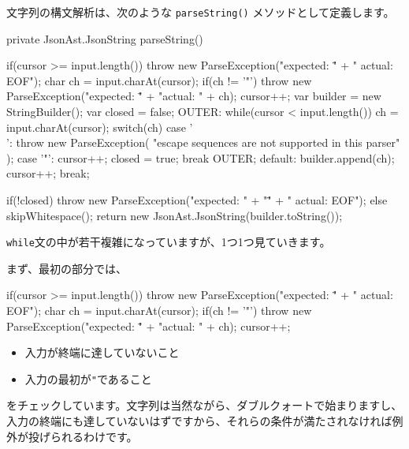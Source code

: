 文字列の構文解析は、次のような \texttt{parseString()}
メソッドとして定義します。

\begin{codescreen}{}
    private JsonAst.JsonString parseString() {
        if(cursor >= input.length()) {
            throw new ParseException("expected: \"" + " actual: EOF");
        }
        char ch = input.charAt(cursor);
        if(ch != '"') {
            throw new ParseException("expected: \"" + "actual: " + ch);
        }
        cursor++;
        var builder = new StringBuilder();
        var closed = false;
        OUTER:
        while(cursor < input.length()) {
            ch = input.charAt(cursor);
            switch(ch) {
                case '\\':
                    throw new ParseException(
                        "escape sequences are not supported in this parser"
                    );
                case '"':
                    cursor++;
                    closed = true;
                    break OUTER;
                default:
                    builder.append(ch);
                    cursor++;
                    break;
            }
        }

        if(!closed) {
            throw new ParseException("expected: " + "\"" + " actual: EOF");
        } else {
            skipWhitespace();
            return new JsonAst.JsonString(builder.toString());
        }
    }
\end{codescreen}

\texttt{while}文の中が若干複雑になっていますが、1つ1つ見ていきます。

まず、最初の部分では、

\begin{codescreen}{}
        if(cursor >= input.length()) {
            throw new ParseException("expected: \"" + " actual: EOF");
        }
        char ch = input.charAt(cursor);
        if(ch != '"') {
            throw new ParseException("expected: \"" + "actual: " + ch);
        }
        cursor++;
\end{codescreen}

\begin{itemize}
\item
  入力が終端に達していないこと
\item
  入力の最初が\texttt{"}であること
\end{itemize}

\noindent をチェックしています。文字列は当然ながら、ダブルクォートで始まりますし、入力の終端にも達していないはずですから、それらの条件が満たされなければ例外が投げられるわけです。

